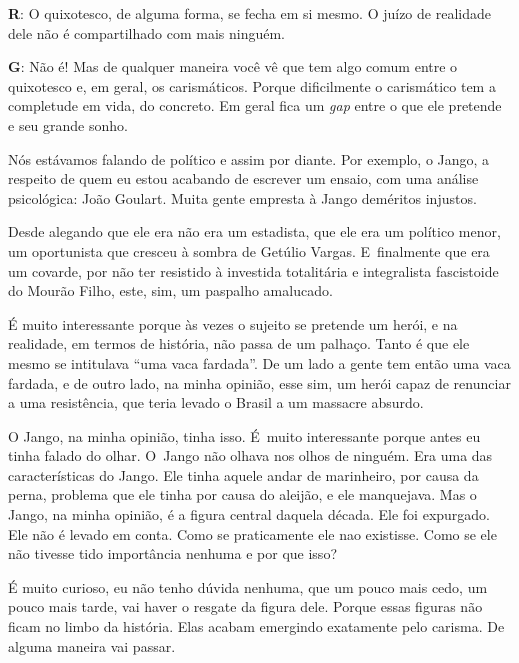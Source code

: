  

\textbf{R}: O quixotesco, de alguma forma, se fecha em si mesmo. O juízo de
realidade dele não é compartilhado com mais ninguém.

 

\textbf{G}: Não é! Mas de qualquer maneira você vê que tem algo comum
entre o quixotesco e, em geral, os carismáticos. Porque dificilmente o
carismático tem a completude em vida, do concreto. Em geral fica um \emph{gap}
entre o que ele pretende e seu grande sonho.

 

Nós estávamos falando de político e assim por diante. Por exemplo, o
Jango, a respeito de quem eu estou acabando de escrever um ensaio, com
uma análise psicológica: João Goulart. Muita gente empresta à Jango
deméritos injustos.

Desde alegando que ele era não era um estadista, que ele era um político
menor, um oportunista que cresceu à sombra de Getúlio Vargas. E~finalmente que era um covarde, por não ter resistido à investida
totalitária e integralista fascistoide do Mourão Filho, este, sim, um
paspalho amalucado.

 

É muito interessante porque às vezes o sujeito se pretende um herói, e
na realidade, em termos de história, não passa de um palhaço. Tanto é
que ele mesmo se intitulava ``uma vaca fardada''. De um lado a gente tem
então uma vaca fardada, e de outro lado, na minha opinião, esse sim, um
herói capaz de renunciar a uma resistência, que teria levado o Brasil a
um massacre absurdo.

 

O Jango, na minha opinião, tinha isso. É~muito interessante porque antes
eu tinha falado do olhar. O~Jango não olhava nos olhos de ninguém. Era
uma das características do Jango. Ele tinha aquele andar de marinheiro,
por causa da perna, problema que ele tinha por causa do aleijão, e ele
manquejava. Mas o Jango, na minha opinião, é a figura central daquela
década. Ele foi expurgado. Ele não é levado em conta. Como se
praticamente ele nao existisse. Como se ele não tivesse tido importância
nenhuma e por que isso?

 

É muito curioso, eu não tenho dúvida nenhuma, que um pouco mais cedo, um
pouco mais tarde, vai haver o resgate da figura dele. Porque essas
figuras não ficam no limbo da história. Elas acabam emergindo exatamente
pelo carisma. De alguma maneira vai passar.

